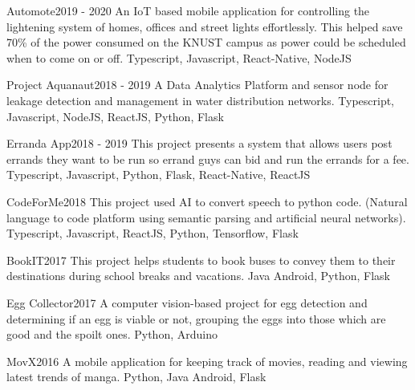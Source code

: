 \begin{projects}
	
	\project
	{Automote}{2019 - 2020}
	{}
	{An IoT based mobile application for controlling the lightening system of homes, offices and street lights effortlessly. This helped save 70\% of the power consumed on the KNUST campus as power could be scheduled when to come on or off.}
	{Typescript, Javascript, React-Native, NodeJS}
	
	\project
	{Project Aquanaut}{2018 - 2019}
	{ }
	{A Data Analytics Platform and sensor node for leakage detection and management in water distribution networks.}
	{Typescript, Javascript, NodeJS, ReactJS, Python, Flask}
	
	\project
	{Erranda App}{2018 - 2019}
	{ }
	{This project presents a system that allows users post errands they want to be run so errand guys can bid and run the errands for a fee.}
	{Typescript, Javascript, Python, Flask, React-Native, ReactJS}
	
	\project
	{CodeForMe}{2018}
	{ }
	{This project used AI to convert speech to python code. (Natural language to code platform using semantic parsing and artificial neural networks).}
	{Typescript, Javascript, ReactJS, Python, Tensorflow, Flask}
	
	\project
	{BookIT}{2017}
	{ }
	{This project helps students to book buses to convey them to their destinations during school breaks and vacations.}
	{Java Android, Python, Flask}
	
	\project
	{Egg Collector}{2017}
	{ }
	{A computer vision-based project for egg detection and determining if an egg is viable or not, grouping the eggs into those which are good and the spoilt ones.}
	{Python, Arduino}
\pagebreak

	\project
	{MovX}{2016}
	{ }
	{A mobile application for keeping track of movies, reading and viewing latest trends of manga.}
	{Python, Java Android, Flask}

\end{projects}
